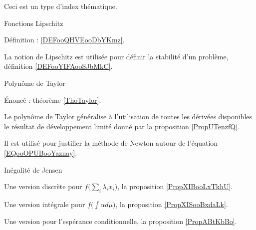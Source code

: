 
Ceci est un type d'index thématique.

\begin{InternalLinks}{Fonctions Lipschitz}
    \item
        Définition : \ref{DEFooQHVEooDbYKmz}.
    \item
        La notion de Lipschitz est utilisée pour définir la stabilité d'un problème, définition \ref{DEFooYIFAooSJbMkC}.
\end{InternalLinks}

\begin{InternalLinks}{Polynôme de Taylor}
    \item
        Énoncé : théorème \ref{ThoTaylor}.
        \item
            Le polynôme de Taylor généralise à l'utilisation de toutes les dérivées disponibles le résultat de développement limité donné par la proposition \ref{PropUTenzfQ}.
        \item
            Il est utilisé pour justifier la méthode de Newton autour de l'équation \eqref{EQooOPUBooYaznay}.
\end{InternalLinks}

\begin{InternalLinks}{Inégalité de Jensen}
    \item
        Une version discrète pour \( f\big( \sum_i\lambda_ix_i \big)\), la proposition \ref{PropXIBooLxTkhU}.
    \item
        Une version intégrale pour \( f\big( \int \alpha d\mu \big)\), la proposition \ref{PropXISooBxdaLk}.
    \item
        Une version pour l'espérance conditionnelle, la proposition \ref{PropABtKbBo}.
\end{InternalLinks}


